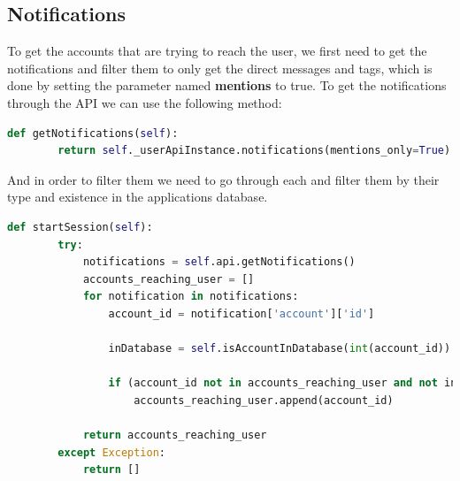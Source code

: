 \subsection{Notifications}\label{ss:notif}
To get the accounts that are trying to reach the user, we first need to get the notifications and filter them to only get the direct messages and tags, which is done
by setting the parameter named \textbf{mentions} to true.
To get the notifications through the API we can use the following method:
\\[5pt]
\begin{lstlisting}[language=python, caption={Getting the notifications by API}, captionpos=b]
	def getNotifications(self):
		return self._userApiInstance.notifications(mentions_only=True)
\end{lstlisting}
And in order to filter them we need to go through each and filter them by their type and existence in the applications database.
\\[5pt]
\begin{lstlisting}[language=python, caption={Filtering the notifications}, captionpos=b]
	def startSession(self):
		try:
			notifications = self.api.getNotifications()
			accounts_reaching_user = []
			for notification in notifications:
				account_id = notification['account']['id']
				
				inDatabase = self.isAccountInDatabase(int(account_id))
		
				if (account_id not in accounts_reaching_user and not inDatabase):
					accounts_reaching_user.append(account_id)
	
			return accounts_reaching_user
		except Exception:
			return []
\end{lstlisting}
